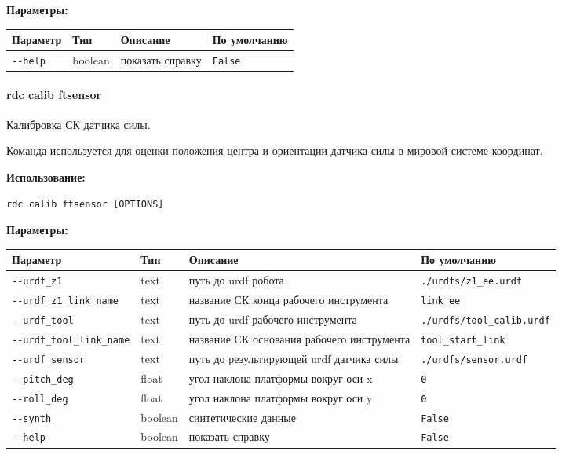 \textbf{Параметры:}
\begin{center}
\fontsize{10pt}{10pt}\selectfont
\begin{longtable}[]{p{5cm}|p{2cm}|p{3.5cm}|p{5cm}}
    \hline
\toprule()
Параметр & Тип & Описание & По умолчанию \\
\hline
\midrule()
\endhead
\texttt{-\/-help} & boolean & показать справку &
\texttt{False} \\
\bottomrule()
\hline
\end{longtable}
\end{center}

\hypertarget{rdc-calib-ftsensor}{%
\paragraph{rdc calib ftsensor}\label{rdc-calib-ftsensor}}

Калибровка СК датчика силы.

Команда используется для оценки положения центра и ориентации датчика силы в мировой системе координат.

\textbf{Использование:}
\begin{lstlisting}[language=python, numbers=none, frame=single]
rdc calib ftsensor [OPTIONS]
\end{lstlisting}

\textbf{Параметры:}
\begin{center}
\fontsize{10pt}{10pt}\selectfont
\begin{longtable}[]{p{5.2cm}|p{2cm}|p{3.5cm}|p{5cm}}
    \hline
\toprule()
Параметр & Тип & Описание & По умолчанию \\
\hline
\midrule()
\endhead
\texttt{-\/-urdf\_z1} & text & путь до urdf робота &
\texttt{./urdfs/z1\_ee.urdf} \\
\hline
\texttt{-\/-urdf\_z1\_link\_name} & text & название СК конца рабочего инструмента &
\texttt{link\_ee} \\
\hline
\texttt{-\/-urdf\_tool} & text & путь до urdf рабочего инструмента &
\texttt{./urdfs/tool\_calib.urdf} \\
\hline
\texttt{-\/-urdf\_tool\_link\_name} & text & название СК основания рабочего инструмента & \texttt{tool\_start\_link} \\
\hline
\texttt{-\/-urdf\_sensor} & text & путь до результирующей urdf датчика силы &
\texttt{./urdfs/sensor.urdf} \\
\hline
\texttt{-\/-pitch\_deg} & float & угол наклона платформы вокруг оси x &
\texttt{0} \\
\hline
\texttt{-\/-roll\_deg} & float & угол наклона платформы вокруг оси y &
\texttt{0} \\
\hline
\texttt{-\/-synth} & boolean & синтетические данные & \texttt{False} \\
\hline
\texttt{-\/-help} & boolean & показать справку &
\texttt{False} \\
\hline
\bottomrule()
\hline
\end{longtable}
\end{center}

